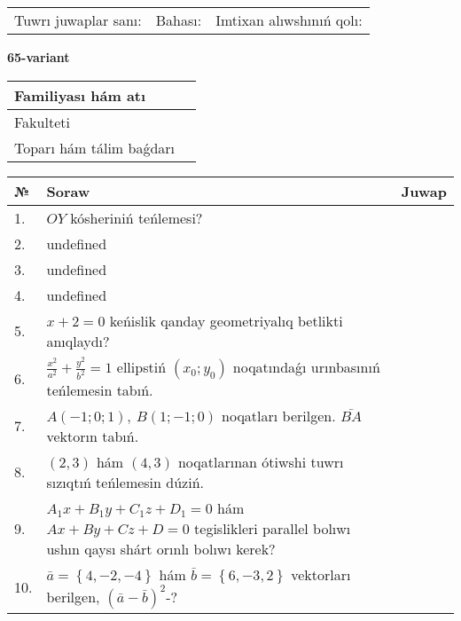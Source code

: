\documentclass{article}
\begin{document}
\vspace{0.7cm}

\begin{tabular}{lll}
Tuwrı juwaplar sanı: \underline{\hspace{1cm}} & 
Bahası: \underline{\hspace{1cm}} & 
Imtixan alıwshınıń qolı: \underline{\hspace{2cm}} \\
\end{tabular}

\egroup

\newpage


\textbf{65-variant}\\

\bgroup
\def\arraystretch{1.6} %

\begin{tabular}{|m{5.7cm}|m{9.5cm}|}
\hline
Familiyası hám atı & \\
\hline
Fakulteti  & \\
\hline
Toparı hám tálim baǵdarı  & \\
\hline
\end{tabular}

\vspace{0.7cm}

\begin{tabular}{|m{0.7cm}|m{10cm}|m{4cm}|}
\hline
№ & Soraw & Juwap \\
\hline
1. & \(OY\) kósheriniń teńlemesi? &  \\
\hline
2. & undefined &  \\
\hline
3. & undefined &  \\
\hline
4. & undefined &  \\
\hline
5. & \(x + 2 = 0\) keńislik qanday geometriyalıq betlikti anıqlaydı? &  \\
\hline
6. & \(\frac{x^{2}}{a^{2}} + \frac{y^{2}}{b^{2}} = 1\) ellipstiń \((x_{0};y_{0})\) noqatındaǵı urınbasınıń teńlemesin tabıń. &  \\
\hline
7. & \(A (- 1;0;1),\ B (1; - 1;0)\) noqatları berilgen. \(\bar{BA}\) vektorın tabıń. &  \\
\hline
8. & $(2, 3)$ hám $(4, 3)$ noqatlarınan ótiwshi tuwrı sızıqtıń teńlemesin dúziń. &  \\
\hline
9. & \(A_{1}x + B_{1}y + C_{1}z + D_{1} = 0\) hám \(Ax + By + Cz + D = 0\) tegislikleri parallel bolıwı ushın qaysı shárt orınlı bolıwı kerek? &  \\
\hline
10. & \(\bar{a} = \left\{ 4,- 2,- 4 \right\}\) hám \(\bar{b} = \left\{ 6,- 3, 2 \right\}\) vektorları berilgen, \((\bar{a} - \bar{b}) ^{2}\)-? & \\
\hline
\end{tabular}
\end{document}
